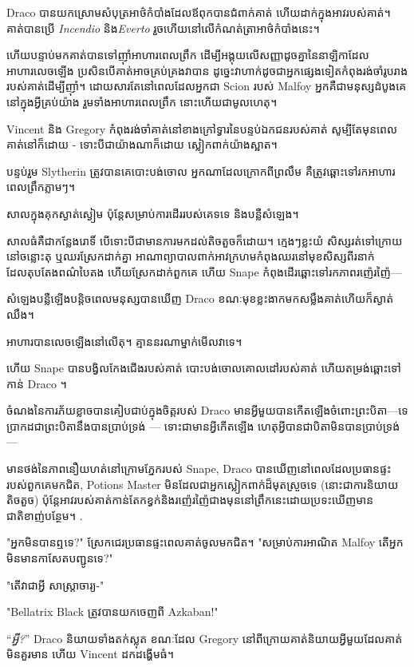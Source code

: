 {Draco បាន​យក​ស្រោមសំបុត្រ​អាថ៌កំបាំង​ដែល​ឪពុក​បាន​ជំពាក់​គាត់ ហើយ​ដាក់​ក្នុង​អាវ​របស់​គាត់។ គាត់បានប្រើ \emph{Incendio} និង\emph{Everto} រួចហើយនៅលើកំណត់ត្រាអាថ៌កំបាំងនេះ។

ហើយបន្ទាប់មកគាត់បានទៅញ៉ាំអាហារពេលព្រឹក ដើម្បីអង្គុយលើសញ្ញាដូចគ្នានៃនាឡិកាដែលអាហារលេចឡើង ប្រសិនបើគាត់អាចគ្រប់គ្រងវាបាន ដូច្នេះវាហាក់ដូចជាអ្នកផ្សេងទៀតកំពុងរង់ចាំរូបរាងរបស់គាត់ដើម្បីញ៉ាំ។ ដោយសារតែនៅពេលដែលអ្នកជា Scion របស់ Malfoy អ្នកគឺជាមនុស្សដំបូងគេនៅក្នុងអ្វីគ្រប់យ៉ាង រួមទាំងអាហារពេលព្រឹក នោះហើយជាមូលហេតុ។

Vincent និង Gregory កំពុងរង់ចាំគាត់នៅខាងក្រៅទ្វារនៃបន្ទប់ឯកជនរបស់គាត់ សូម្បីតែមុនពេលគាត់នៅក៏ដោយ - ទោះបីជាយ៉ាងណាក៏ដោយ ស្លៀកពាក់យ៉ាងស្អាត។

បន្ទប់រួម Slytherin ត្រូវបានគេបោះបង់ចោល អ្នកណាដែលក្រោកពីព្រលឹម គឺត្រូវឆ្ពោះទៅរកអាហារពេលព្រឹកភ្លាមៗ។

សាល​ក្នុង​គុក​ស្ងាត់​ស្ងៀម ប៉ុន្តែ​សម្រាប់​ការ​ដើរ​របស់​គេ​ទទេ និង​បន្លឺ​សំឡេង។

សាលធំគឺជាកន្លែងរោទិ៍ បើទោះបីជាមានការមកដល់តិចតួចក៏ដោយ។ ក្មេងៗខ្លះយំ សិស្សរត់ទៅក្រោយនៅចន្លោះតុ ឬឈរស្រែកដាក់គ្នា អាណាព្យាបាលពាក់អាវក្រហមកំពុងឈរនៅមុខសិស្សពីរនាក់ដែលតុបតែងពណ៌បៃតង ហើយស្រែកដាក់ពួកគេ ហើយ Snape កំពុងដើរឆ្ពោះទៅរកភាពរញ៉េរញ៉ៃ—

សំឡេង​បន្លឺ​ឡើង​បន្តិច​ពេល​មនុស្ស​បាន​ឃើញ​ Draco ខណៈ​មុខ​ខ្លះ​ងាក​មក​សម្លឹង​គាត់​ហើយ​ក៏​ស្ងាត់​ឈឹង។

អាហារបានលេចឡើងនៅលើតុ។ គ្មាននរណាម្នាក់មើលវាទេ។

ហើយ Snape បានបង្វិលកែងជើងរបស់គាត់ បោះបង់ចោលគោលដៅរបស់គាត់ ហើយតម្រង់ឆ្ពោះទៅកាន់ Draco ។

ចំណង​នៃ​ការ​ភ័យ​ខ្លាច​បាន​គៀប​ជាប់​ក្នុង​ចិត្ត​របស់ Draco មាន​អ្វី​មួយ​បាន​កើត​ឡើង​ចំពោះ​ព្រះបិតា—ទេ ប្រាកដ​ជា​ព្រះបិតា​នឹង​បាន​ប្រាប់​ទ្រង់ — ទោះ​ជា​មាន​អ្វី​កើត​ឡើង ហេតុ​អ្វី​បាន​ជា​បិតា​មិន​បាន​ប្រាប់​ទ្រង់—

មានថង់នៃភាពនឿយហត់នៅក្រោមភ្នែករបស់ Snape, Draco បានឃើញនៅពេលដែលប្រធានផ្ទះរបស់ពួកគេមកជិត, Potions Master មិនដែលជាអ្នកស្លៀកពាក់ដ៏មុតស្រួចទេ (នោះជាការនិយាយតិចតួច) ប៉ុន្តែអាវរបស់គាត់កាន់តែកខ្វក់និងរញ៉េរញ៉ៃជាងមុននៅព្រឹកនេះដោយប្រទះឃើញមានជាតិខាញ់បន្ថែម។ .

"អ្នកមិនបានឮទេ?" ស្រែក​ជេរ​ប្រធាន​ផ្ទះ​ពេល​គាត់​ចូល​មក​ជិត។ "សម្រាប់ការអាណិត Malfoy តើអ្នកមិនមានកាសែតបញ្ជូនទេ?"

"តើវាជាអ្វី សាស្រ្តាចារ្យ-"

"Bellatrix Black ត្រូវបានយកចេញពី Azkaban!"

“\emph{អ្វី?}” Draco និយាយទាំងតក់ស្លុត ខណៈដែល Gregory នៅពីក្រោយគាត់និយាយអ្វីមួយដែលគាត់មិនគួរមាន ហើយ Vincent ដកដង្ហើមធំ។

}
